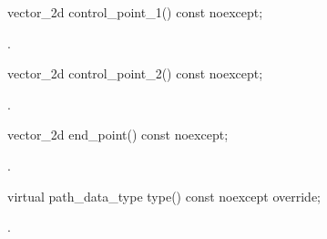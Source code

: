 \begin{itemdecl}
    vector_2d control_point_1() const noexcept;
\end{itemdecl}
\begin{itemdescr}
	\pnum
	\returns
	.

\end{itemdescr}

\begin{itemdecl}
    vector_2d control_point_2() const noexcept;
\end{itemdecl}
\begin{itemdescr}
	\pnum
	\returns
	.

\end{itemdescr}

\begin{itemdecl}
    vector_2d end_point() const noexcept;
\end{itemdecl}
\begin{itemdescr}
	\pnum
	\returns
	.

\end{itemdescr}

\begin{itemdecl}
    virtual path_data_type type() const noexcept override;
\end{itemdecl}
\begin{itemdescr}
	\pnum
	\returns
	.

\end{itemdescr}
